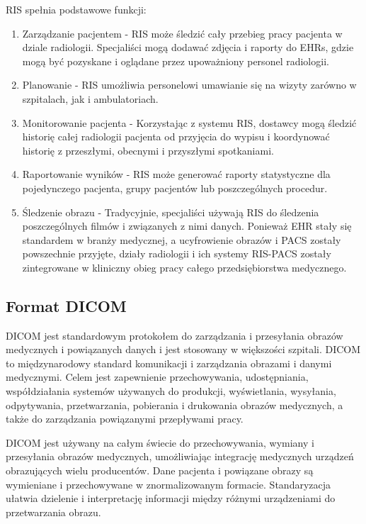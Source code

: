 \documentclass[a4paper,11pt,twoside]{report}
\theoremstyle{definition}
\begin{document}
RIS spełnia podstawowe funkcji:
\begin{enumerate}
\item Zarządzanie pacjentem - RIS może śledzić cały przebieg pracy pacjenta w dziale radiologii. Specjaliści mogą dodawać zdjęcia i raporty do EHRs, gdzie mogą być pozyskane i oglądane przez upoważniony personel radiologii.
\item Planowanie - RIS umożliwia personelowi umawianie się na wizyty zarówno w szpitalach, jak i ambulatoriach.
\item Monitorowanie pacjenta - Korzystając z systemu RIS, dostawcy mogą śledzić historię całej radiologii pacjenta od przyjęcia do wypisu i koordynować historię z przeszłymi, obecnymi i przyszłymi spotkaniami.
\item Raportowanie wyników - RIS może generować raporty statystyczne dla pojedynczego pacjenta, grupy pacjentów lub poszczególnych procedur.
\item Śledzenie obrazu - Tradycyjnie, specjaliści używają RIS do śledzenia poszczególnych filmów i związanych z nimi danych. Ponieważ EHR stały się standardem w branży medycznej, a ucyfrowienie obrazów i PACS zostały powszechnie przyjęte, działy radiologii i ich systemy RIS-PACS zostały zintegrowane w kliniczny obieg pracy całego przedsiębiorstwa medycznego.
\end{enumerate}

\subsection{Format DICOM}

DICOM jest standardowym protokołem do zarządzania i przesyłania obrazów medycznych i powiązanych danych i jest stosowany w większości szpitali. DICOM to międzynarodowy standard komunikacji i zarządzania obrazami i danymi medycznymi. Celem jest zapewnienie przechowywania, udostępniania, współdziałania systemów używanych do produkcji, wyświetlania, wysyłania, odpytywania, przetwarzania, pobierania i drukowania obrazów medycznych, a także do zarządzania powiązanymi przepływami pracy.
\par
DICOM jest używany na całym świecie do przechowywania, wymiany i przesyłania obrazów medycznych, umożliwiając integrację medycznych urządzeń obrazujących wielu producentów. Dane pacjenta i powiązane obrazy są wymieniane i przechowywane w znormalizowanym formacie.
Standaryzacja ułatwia dzielenie i interpretację informacji między różnymi urządzeniami do przetwarzania obrazu.
\end{document}

